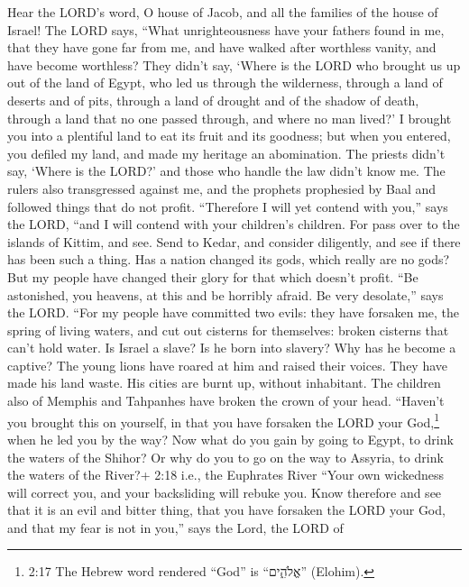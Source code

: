  Hear the LORD's word, O house of Jacob, and all the
families of the house of Israel!  The LORD says, ``What
unrighteousness have your fathers found in me, that they have gone far
from me, and have walked after worthless vanity, and have become
worthless?  They didn't say, `Where is the LORD who brought
us up out of the land of Egypt, who led us through the wilderness,
through a land of deserts and of pits, through a land of drought and of
the shadow of death, through a land that no one passed through, and
where no man lived?'  I brought you into a plentiful land to
eat its fruit and its goodness; but when you entered, you defiled my
land, and made my heritage an abomination.  The priests
didn't say, `Where is the LORD?' and those who handle the law didn't
know me. The rulers also transgressed against me, and the prophets
prophesied by Baal and followed things that do not profit. 
``Therefore I will yet contend with you,'' says the LORD, ``and I will
contend with your children's children.  For pass over to
the islands of Kittim, and see. Send to Kedar, and consider diligently,
and see if there has been such a thing.  Has a nation
changed its gods, which really are no gods? But my people have changed
their glory for that which doesn't profit.  ``Be
astonished, you heavens, at this and be horribly afraid. Be very
desolate,'' says the LORD.  ``For my people have committed
two evils: they have forsaken me, the spring of living waters, and cut
out cisterns for themselves: broken cisterns that can't hold water.
 Is Israel a slave? Is he born into slavery? Why has he
become a captive?  The young lions have roared at him and
raised their voices. They have made his land waste. His cities are burnt
up, without inhabitant.  The children also of Memphis and
Tahpanhes have broken the crown of your head.  ``Haven't
you brought this on yourself, in that you have forsaken the LORD your
God,\footnote{2:17 The Hebrew word rendered ``God'' is ``אֱלֹהִ֑ים''
  (Elohim).} when he led you by the way?  Now what do you
gain by going to Egypt, to drink the waters of the Shihor? Or why do you
to go on the way to Assyria, to drink the waters of the River?+ 2:18
i.e., the Euphrates River  ``Your own wickedness will
correct you, and your backsliding will rebuke you. Know therefore and
see that it is an evil and bitter thing, that you have forsaken the LORD
your God, and that my fear is not in you,'' says the Lord, the LORD of
